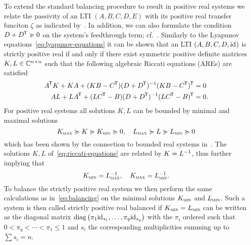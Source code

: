 To extend the standard balancing procedure to result in positive real systems we relate the passivity of an LTI $(A, B, C, D, E)$ with its positive real transfer funciton $\zeta$ as indicated by~\cite[Corollary~2.7]{CGH2022}.
In addition, we can also formulate the condition $D + D\trans \succcurlyeq 0$ on the system's feedthrough term; cf.~\cite[Definition~5]{Gugercin2007}.
Similarly to the Lyapunov equations~\eqref{eq:lyapunov-equations} it can be shown that an LTI $(A, B, C, D, \id)$ is strictly positive real if and only if there exist symmetric positive definite matrices $K, L \in \bb{C}^{n \times n}$ such that the following algebraic Riccati equations (AREs) are satisfied
\begin{equation}\label{eq:riccati-equations}
    \begin{aligned}
        A\trans K + K A + (K B - C\trans) (D + D\trans)\inv (K B - C\trans)\trans &= 0 \\
        A L + L A\trans + (L C\trans - B) (D + D\trans)\inv (L C\trans - B)\trans &= 0.
    \end{aligned}
\end{equation}
For positive real systems all solutions $K, L$ can be bounded by minimal and maximal solutions
\begin{equation*}
    K_{\msc{max}} \succcurlyeq K \succcurlyeq K_{\msc{min}} \succcurlyeq 0,\quad L_{\msc{max}} \succcurlyeq L \succcurlyeq L_{\msc{min}} \succcurlyeq 0
\end{equation*}
which has been shown by the connection to bounded real systems in~\cite[Proposition~5.1]{Ober1991}.
The solutions $K, L$ of~\eqref{eq:riccati-equations} are related by $K = L\inv$, thus further implying that
\begin{equation*}
    K_{\msc{min}} = L_{\msc{max}}\inv,\quad K_{\msc{max}} = L_{\msc{min}}\inv.
\end{equation*}
To balance the strictly positive real system we then perform the same calculations as in~\eqref{eq:balancing} on the minimal solutions $K_{\msc{min}}$ and $L_{\msc{min}}$.
Such a system is then called strictly positive real balanced if $K_{\msc{min}} = L_{\msc{min}}$ can be written as the diagonal matrix $\diag{\pi_1 \id[s_1], \dots, \pi_q \id[s_q]}$ with the $\pi_i$ ordered such that $0 < \pi_q < \cdots < \pi_1 \leq 1$ and $s_i$ the corresponding multiplicities summing up to $\sum s_i = n$.


